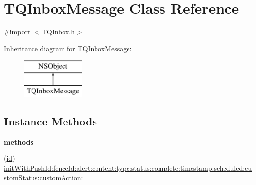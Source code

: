 \hypertarget{interface_t_q_inbox_message}{}\section{T\+Q\+Inbox\+Message Class Reference}
\label{interface_t_q_inbox_message}


{\ttfamily \#import $<$T\+Q\+Inbox.\+h$>$}

Inheritance diagram for T\+Q\+Inbox\+Message\+:\begin{figure}[H]
\begin{center}
\leavevmode
\includegraphics[height=2.000000cm]{interface_t_q_inbox_message}
\end{center}
\end{figure}
\subsection*{Instance Methods}
\begin{Indent}{\bf methods}\par
\begin{DoxyCompactItemize}
\item 
(\hyperlink{interface_t_q_inbox_message_a21a1990209c33c87dea6e82fb9878a29}{id}) -\/ \hyperlink{interface_t_q_inbox_message_aed6a33a1494e27e48a04191d9c12de37}{init\+With\+Push\+Id\+:fence\+Id\+:alert\+:content\+:type\+:status\+:complete\+:timestamp\+:scheduled\+:custom\+Status\+:custom\+Action\+:}
\end{DoxyCompactItemize}
\end{Indent}
